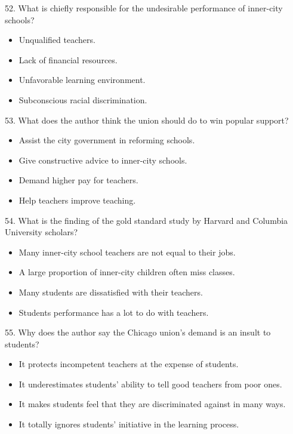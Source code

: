 \documentclass[UTF8,11pt]{ctexart}
\begin{document}
52. What is chiefly responsible for the undesirable performance of inner-city schools?


\begin{itemize}[leftmargin=2em,itemsep=.2em,topsep=.4em]\item[A.] Unqualified teachers.
\item[B.] Lack of financial resources.
\item[C.] Unfavorable learning environment.
\item[D.] Subconscious racial discrimination.
\end{itemize}

53. What does the author think the union should do to win popular support?


\begin{itemize}[leftmargin=2em,itemsep=.2em,topsep=.4em]\item[A.] Assist the city government in reforming schools.
\item[B.] Give constructive advice to inner-city schools.
\item[C.] Demand higher pay for teachers.
\item[D.] Help teachers improve teaching.
\end{itemize}

54. What is the finding of the gold standard study by Harvard and Columbia University scholars?


\begin{itemize}[leftmargin=2em,itemsep=.2em,topsep=.4em]\item[A.] Many inner-city school teachers are not equal to their jobs.
\item[B.] A large proportion of inner-city children often miss classes.
\item[C.] Many students are dissatisfied with their teachers.
\item[D.] Students performance has a lot to do with teachers.
\end{itemize}

55. Why does the author say the Chicago union’s demand is an insult to students?


\begin{itemize}[leftmargin=2em,itemsep=.2em,topsep=.4em]\item[A.] It protects incompetent teachers at the expense of students.
\item[B.] It underestimates students’ ability to tell good teachers from poor ones.
\item[C.] It makes students feel that they are discriminated against in many ways.
\item[D.] It totally ignores students’ initiative in the learning process.
\end{itemize}
\end{document}

